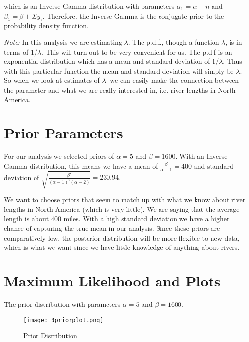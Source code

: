 \documentclass[12pt]{article}
\begin{document}
\noindent which is an Inverse Gamma distribution with parameters $\alpha_1=\alpha+n$ and $\beta_1=\beta+\Sigma y_i$.  Therefore, the Inverse Gamma is the conjugate prior to the probability density function.
\bigskip

\begin{scriptsize}
\noindent \textit{Note:} In this analysis we are estimating $\lambda$.  The p.d.f., though a function $\lambda$, is in terms of $1/\lambda$.  This will turn out to be very convenient for us.  The p.d.f is an exponential distribution which has a mean and standard deviation of $1/\lambda$.  Thus with this particular function the mean and standard deviation will simply be $\lambda$.  So when we look at estimates of $\lambda$, we can easily make the connection between the parameter and what we are really interested in, i.e. river lengths in North America.
\end{scriptsize}

\section*{Prior Parameters}

\noindent For our analysis we selected priors of $\alpha=5$ and $\beta=1600$.  With an Inverse Gamma distribution, this means we have a mean of $\frac{\beta}{\alpha-1}=400$ and standard deviation of $\sqrt{\frac{\beta^2}{(\alpha-1)^2(\alpha-2)}}=230.94$.
\bigskip

\noindent We want to choose priors that seem to match up with what we know about river lengths in North America (which is very little).  We are saying that the average length is about $400$ miles.  With a high standard deviation we have a higher chance of capturing the true mean in our analysis.  Since these priors are comparatively low, the posterior distribution will be more flexible to new data, which is what we want since we have little knowledge of anything about rivers.

\section*{Maximum Likelihood and Plots}

The prior distribution with parameters $\alpha=5$ and $\beta=1600$. \\ [-.8cm]

\begin{figure}[H]
\begin{center}
\texttt{[image: 3priorplot.png]}
\caption{Prior Distribution}
\end{center}
\end{figure}
\end{document}
